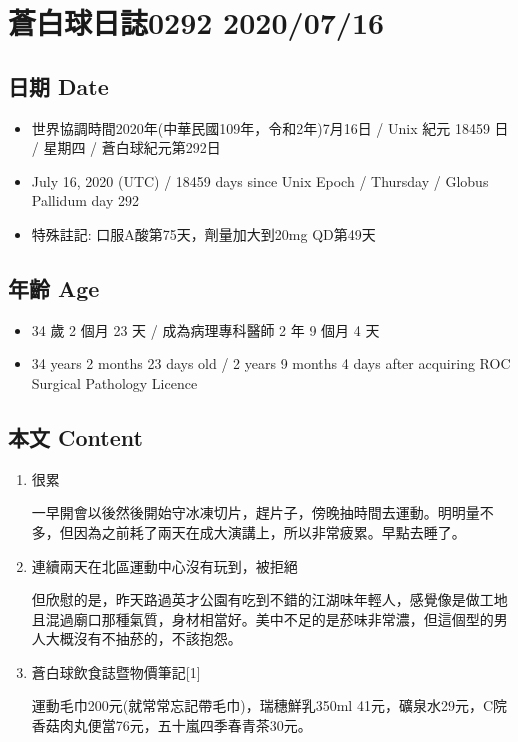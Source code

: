 \documentclass[
]{article}
\providecommand{\tightlist}{%
  \setlength{\itemsep}{0pt}\setlength{\parskip}{0pt}}
\begin{document}
\hypertarget{ux84bcux767dux7403ux65e5ux8a8c0292-20200716}{%
\section{蒼白球日誌0292
2020/07/16}\label{ux84bcux767dux7403ux65e5ux8a8c0292-20200716}}

\hypertarget{ux65e5ux671f-date-15}{%
\subsection{日期 Date}\label{ux65e5ux671f-date-15}}

\begin{itemize}
\tightlist
\item
  世界協調時間2020年(中華民國109年，令和2年)7月16日 / Unix 紀元 18459 日
  / 星期四 / 蒼白球紀元第292日
\item
  July 16, 2020 (UTC) / 18459 days since Unix Epoch / Thursday / Globus
  Pallidum day 292
\item
  特殊註記: 口服A酸第75天，劑量加大到20mg QD第49天
\end{itemize}

\hypertarget{ux5e74ux9f61-age-15}{%
\subsection{年齡 Age}\label{ux5e74ux9f61-age-15}}

\begin{itemize}
\tightlist
\item
  34 歲 2 個月 23 天 / 成為病理專科醫師 2 年 9 個月 4 天
\item
  34 years 2 months 23 days old / 2 years 9 months 4 days after
  acquiring ROC Surgical Pathology Licence
\end{itemize}

\hypertarget{ux672cux6587-content-15}{%
\subsection{本文 Content}\label{ux672cux6587-content-15}}

\begin{enumerate}
\def\labelenumi{\arabic{enumi}.}
\item
  很累

  一早開會以後然後開始守冰凍切片，趕片子，傍晚抽時間去運動。明明量不多，但因為之前耗了兩天在成大演講上，所以非常疲累。早點去睡了。
\item
  連續兩天在北區運動中心沒有玩到，被拒絕

  但欣慰的是，昨天路過英才公園有吃到不錯的江湖味年輕人，感覺像是做工地且混過廟口那種氣質，身材相當好。美中不足的是菸味非常濃，但這個型的男人大概沒有不抽菸的，不該抱怨。
\item
  蒼白球飲食誌暨物價筆記{[}1{]}

  運動毛巾200元(就常常忘記帶毛巾)，瑞穗鮮乳350ml
  41元，礦泉水29元，C院香菇肉丸便當76元，五十嵐四季春青茶30元。
\end{enumerate}
\end{document}
